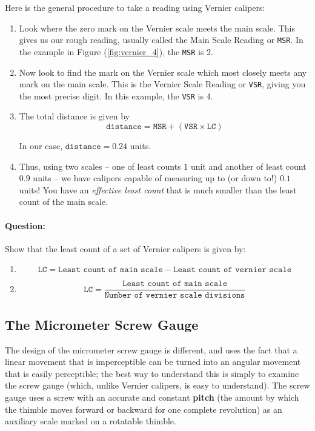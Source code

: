 Here is the general procedure to take a reading using Vernier calipers:

\begin{enumerate}
    \item Look where the zero mark on the Vernier scale meets the main scale. This gives us our rough reading, usually called the Main Scale Reading or \texttt{MSR}. In the example in Figure (\ref{fig:vernier_4}), the \texttt{MSR} is 2.
    
    \item Now look to find the mark on the Vernier scale which most closely meets any mark on the main scale. This is the Vernier Scale Reading or \texttt{VSR}, giving you the most precise digit. In this example, the \texttt{VSR} is 4.
    
    \item The total distance is given by 
    $$\texttt{distance} = \texttt{MSR} + \left(\texttt{VSR}\times\texttt{LC}\right)$$
    
    In our case, $\texttt{distance} = 0.24$ units.
    
    \item Thus, using two scales -- one of least counts $1$ unit and another of least count $0.9$ units -- we have calipers capable of measuring up to (or down to!) $0.1$ units! You have an \textit{effective least count} that is much smaller than the least count of the main scale. 
\end{enumerate}

\begin{question}
\paragraph{Question:} Show that the least count of a set of Vernier calipers is given by:
\begin{enumerate}
    \item $$\texttt{LC} = \texttt{Least count of main scale} - \texttt{Least count of vernier scale}$$
    \item $$\texttt{LC} = \frac{\texttt{Least count of main scale}}{\texttt{Number of vernier scale divisions}}$$
\end{enumerate}
\end{question}

\subsection{The Micrometer Screw Gauge}

The design of the micrometer screw gauge is different, and uses the fact that a linear movement that is imperceptible can be turned into an angular movement that is easily perceptible; the best way to understand this is simply to examine the screw gauge (which, unlike Vernier calipers, is easy to understand). The screw gauge uses a screw with an accurate and constant \textbf{pitch} (the amount by which the thimble moves forward or backward for one complete revolution) as an auxiliary scale marked on a rotatable thimble.  

